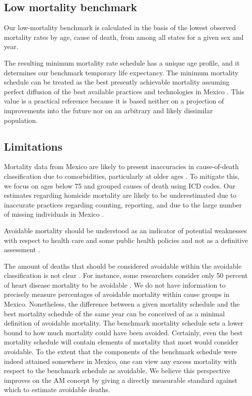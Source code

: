 \documentclass{bmcart}
\begin{document}
\subsection*{Low mortality benchmark}
Our low-mortality benchmark is calculated in the basis of the lowest observed mortality rates by age, cause of death, from among all states for a given sex and year.

The resulting minimum mortality rate schedule has a unique age profile, and it determines our benchmark temporary life expectancy. The minimum mortality schedule can be treated as the best presently achievable mortality assuming perfect diffusion of the best available practices and technologies in Mexico \cite{vallin2008minimum}. This value is a practical reference because it is based neither on a projection of improvements into the future nor on an arbitrary and likely dissimilar population. 


\subsection*{Limitations}
Mortality data from Mexico are
likely to present inaccuracies in cause-of-death classification due to
comorbidities, particularly at older ages \cite{tobias2001}. To mitigate this,
we focus on ages below 75 and grouped causes of death using ICD codes.
Our estimates regarding homicide mortality are likely to be
underestimated due to inaccurate practices regarding counting, reporting,
and due to the large number of missing individuals in Mexico \cite{HRW2011}.

Avoidable mortality should be understood as an indicator of potential
weaknesses with respect to health care and some public health policies and not
as a definitive assessment \cite{nolte&mckee2008}.

The amount of deaths that should be considered avoidable within the avoidable classification is not clear \cite{beltran2011avoidable}. For instance, some researchers consider only 50 percent of heart disease mortality to be avoidable \cite{nolte2012amenable, holland2003}. We do not have information to precisely
measure percentages of avoidable mortality within cause groups in Mexico. Nonetheless, the
difference between a given mortality schedule and the best mortality schedule of
the same year can be conceived of as a minimal definition of avoidable
mortality. The benchmark mortality schedule sets a lower bound to how much mortality could have been avoided. Certainly, even the best mortality schedule will contain elements of mortality that
most would consider avoidable. To the extent that the components of the benchmark schedule were indeed
attained somewhere in Mexico, one can view any excess mortality
with respect to the benchmark schedule as avoidable. We believe this perspective improves on the AM concept by giving a directly measurable standard against which to estimate avoidable deaths.
\end{document}
